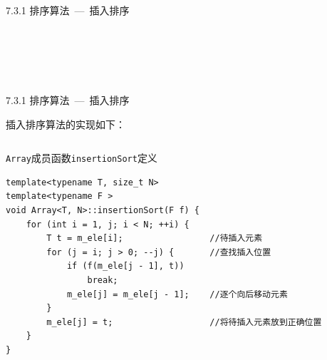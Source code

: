 \begin{frame}[fragile]{7.3.1 排序算法\normalsize{~---~插入排序}}
\begin{center}
\\\vspace{-10.9mm}
\\\vspace{-10.9mm}
\\\vspace{1mm}
\\\vspace{-10.8mm}
\end{center}

\end{frame}


\begin{frame}[fragile]{7.3.1 排序算法\normalsize{~---~插入排序}}

插入排序算法的实现如下：

\vspace{-4mm}

\begin{columns}[t]

\begin{blueblock}{\texttt{Array}成员函数\texttt{insertionSort}定义}
\begin{lstlisting}[moreemph={Array,T,F}]
template<typename T, size_t N>
template<typename F >
void Array<T, N>::insertionSort(F f) {
    for (int i = 1, j; i < N; ++i) {
        T t = m_ele[i];                 //待插入元素
        for (j = i; j > 0; --j) {       //查找插入位置
            if (f(m_ele[j - 1], t))
                break;
            m_ele[j] = m_ele[j - 1];    //逐个向后移动元素
        }
        m_ele[j] = t;                   //将待插入元素放到正确位置
    }
}
\end{lstlisting}
\end{blueblock}


\end{columns}

\end{frame}


